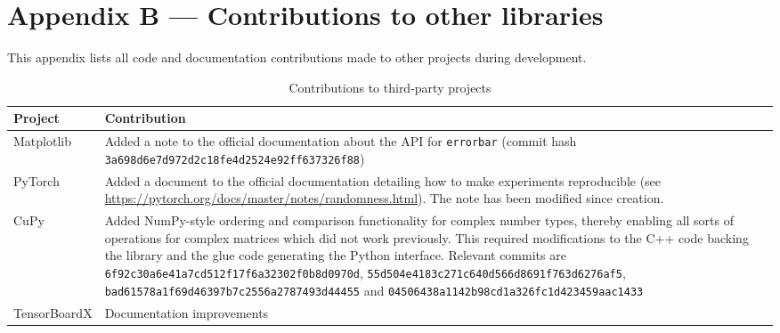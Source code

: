 \chapter{Appendix B --- Contributions to other libraries}\label{ch:appendixB}

This appendix lists all code and documentation contributions made to other projects during
development.

\begin{table}[h]
    \centering
    \caption{Contributions to third-party projects}
    \label{tbl:pull}
    \begin{tabularx}{\textwidth}{lX}
        \toprule
        Project              & Contribution                                                  \tabularnewline
        \midrule
        Matplotlib           & Added a note to the official documentation about the API
                               for \texttt{errorbar} (commit hash
                               \texttt{3a698d6e7d972d2c18fe4d2524e92ff637326f88})            \tabularnewline
        PyTorch              & Added a document to the official documentation detailing
                               how to make experiments reproducible (see
                               \url{https://pytorch.org/docs/master/notes/randomness.html}).
                               The note has been modified since creation.                    \tabularnewline
        CuPy                 & Added NumPy-style ordering and comparison
                               functionality
                               for complex number types, thereby enabling all sorts of operations for
                               complex matrices which did not work previously. This required
                               modifications to the C++ code backing the library and the glue code
                               generating the Python interface. Relevant commits are
                               \texttt{6f92c30a6e41a7cd512f17f6a32302f0b8d0970d},
                               \texttt{55d504e4183c271c640d566d8691f763d6276af5},
                               \texttt{bad61578a1f69d46397b7c2556a2787493d44455} and
                               \texttt{04506438a1142b98cd1a326fc1d423459aac1433}             \tabularnewline
        TensorBoardX         & Documentation improvements                                    \tabularnewline
        \bottomrule
    \end{tabularx}
\end{table}
